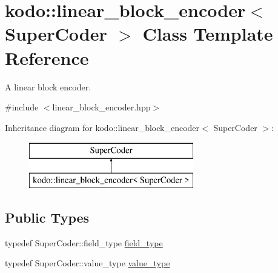 \hypertarget{classkodo_1_1linear__block__encoder}{\section{kodo\-:\-:linear\-\_\-block\-\_\-encoder$<$ Super\-Coder $>$ Class Template Reference}
\label{classkodo_1_1linear__block__encoder}
}


A linear block encoder.  




{\ttfamily \#include $<$linear\-\_\-block\-\_\-encoder.\-hpp$>$}

Inheritance diagram for kodo\-:\-:linear\-\_\-block\-\_\-encoder$<$ Super\-Coder $>$\-:\begin{figure}[H]
\begin{center}
\leavevmode
\includegraphics[height=2.000000cm]{classkodo_1_1linear__block__encoder}
\end{center}
\end{figure}
\subsection*{Public Types}
\begin{DoxyCompactItemize}
\item 
typedef Super\-Coder\-::field\-\_\-type \hyperlink{classkodo_1_1linear__block__encoder_a92a5f9946dea7a5cdcf84f36941ec23c}{field\-\_\-type}
\begin{DoxyCompactList}\small\item\em \end{DoxyCompactList}\item 
typedef Super\-Coder\-::value\-\_\-type \hyperlink{classkodo_1_1linear__block__encoder_a93c27872d487737c33fc58b3633407d5}{value\-\_\-type}
\begin{DoxyCompactList}\small\item\em \end{DoxyCompactList}\end{DoxyCompactItemize}
